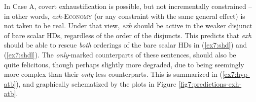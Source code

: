 In Case A, covert exhaustification is possible, but not incrementally constrained -- in other words, \textit{exh}-\textsc{Economy} (or any constraint with the same general effect) is not taken to be real. Under that view, \textit{exh} should be active in the weaker disjunct of bare scalar HDs, regardless of the order of the disjuncts. This predicts that \textit{exh} should be able to rescue \textit{both} orderings of the bare scalar HDs in (\ref{ex7:shd}) and (\ref{ex7:shdl}). The \textit{only}-marked counterparts of these sentences, should also be quite felicitous, though perhaps slightly more degraded, due to being seemingly more complex than their \textit{only}-less counterparts. This is summarized in (\ref{ex7:hyp-atb}), and graphically schematized by the plots in Figure \ref{fig7:predictions-exh-atb}.
\begin{exe}
	\label{ex7:hyp-atb}
\end{exe}
